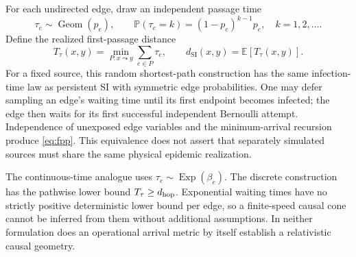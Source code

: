 \documentclass[11pt,letterpaper]{article}
\theoremstyle{definition}
\theoremstyle{remark}
\newcommand{\E}{\mathbb E}
\newcommand{\Prob}{\mathbb P}
\newcommand{\dSI}{d_{\mathrm{SI}}}
\newcommand{\Geom}{\operatorname{Geom}}
\newcommand{\Exp}{\operatorname{Exp}}
\begin{document}
For each undirected edge, draw an independent passage time
\begin{equation}
 \tau_e\sim\Geom(p_e),\qquad
 \Prob(\tau_e=k)=(1-p_e)^{k-1}p_e,\quad k=1,2,\ldots.
 \label{eq:geom}
\end{equation}
Define the realized first-passage distance
\begin{equation}
 T_\tau(x,y)=\min_{P:x\leadsto y}\sum_{e\in P}\tau_e,
 \qquad \dSI(x,y)=\E[T_\tau(x,y)].
 \label{eq:fpp}
\end{equation}
For a fixed source, this random shortest-path construction has the same infection-time law as persistent SI with symmetric edge probabilities. One may defer sampling an edge's waiting time until its first endpoint becomes infected; the edge then waits for its first successful independent Bernoulli attempt. Independence of unexposed edge variables and the minimum-arrival recursion produce \eqref{eq:fpp}. This equivalence does not assert that separately simulated sources must share the same physical epidemic realization.

The continuous-time analogue uses $\tau_e\sim\Exp(\beta_e)$. The discrete construction has the pathwise lower bound $T_\tau\geq d_{\rm hop}$. Exponential waiting times have no strictly positive deterministic lower bound per edge, so a finite-speed causal cone cannot be inferred from them without additional assumptions. In neither formulation does an operational arrival metric by itself establish a relativistic causal geometry.
\end{document}
